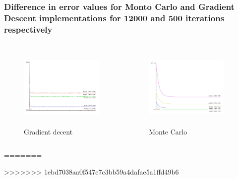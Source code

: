 \documentclass[presentation]{beamer}   %
\begin{document}
\begin{frame}
\begin{frame}
\frametitle{Difference in error values for Monto Carlo and Gradient Descent implementations for 12000 and 500 iterations respectively}
\begin{columns}[t] %
		\begin{figure}
		\centering
			\includegraphics[width=40mm,height=40mm]{fig/smm_error.png}
			\caption{Gradient decent}
		\end{figure}
		\begin{figure}
			\centering
			\includegraphics[width=40mm,height=40mm]{fig/smm_mc_error.png}
			\caption{Monte Carlo}
		\end{figure}
  \end{columns}
\end{frame}

=======
\end{frame}
>>>>>>> 1ebd7038aa0f547e7c3bb59a4dafae5a1ffd49b6
\end{document}
